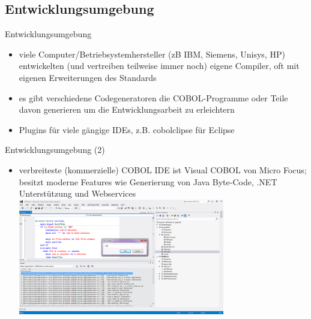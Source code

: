 \documentclass[handout]{beamer}
\begin{document}
\subsection{Entwicklungsumgebung}
\begin{frame}{Entwicklungsumgebung}
	\begin{itemize}[<+->]
		\item
			viele Computer/Betriebsystemhersteller (zB IBM, Siemens, Unisys, HP) entwickelten (und vertreiben teilweise immer noch) eigene Compiler, oft mit eigenen Erweiterungen des Standards
		\item
			es gibt verschiedene Codegeneratoren die COBOL-Programme oder Teile davon generieren um die Entwicklungsarbeit zu erleichtern
		\item
			Plugins für viele gängige IDEs, z.B. cobolclipse für Eclipse
	\end{itemize}
\end{frame}

\begin{frame}{Entwicklungsumgebung (2)}
	\begin{itemize}
		\item
			verbreiteste (kommerzielle) COBOL IDE ist Visual COBOL von Micro Focus; besitzt moderne Features wie Generierung von Java Byte-Code, .NET Unterstützung und Webservices
		\includegraphics[width=9cm]{VisualCOBOL2}
	\end{itemize}
\end{frame}
\end{document}
